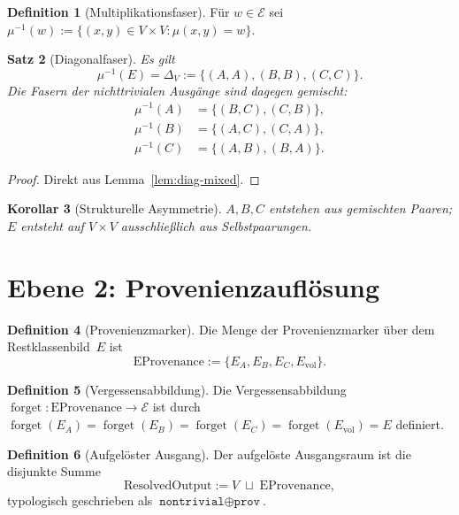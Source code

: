 \documentclass[11pt,a4paper]{article}
\newtheorem{theorem}{Satz}
\newtheorem{corollary}[theorem]{Korollar}
\theoremstyle{definition}
\newtheorem{definition}[theorem]{Definition}
\theoremstyle{remark}
\newcommand{\E}{\mathcal{E}}
\newcommand{\Evol}{E_{\mathrm{vol}}}
\newcommand{\forget}{\operatorname{forget}}
\begin{document}
	\begin{definition}[Multiplikationsfaser]
		\label{def:fiber}
		Für $w\in\E$ sei $\mu^{-1}(w):=\{(x,y)\in V\times V:\mu(x,y)=w\}$.
	\end{definition}
	
	\begin{theorem}[Diagonalfaser]
		\label{thm:diagonal-fiber}
		Es gilt
		\[
		\mu^{-1}(E)=\Delta_V:=\{(A,A),(B,B),(C,C)\}.
		\]
		Die Fasern der nichttrivialen Ausgänge sind dagegen gemischt:
		\begin{align*}
			\mu^{-1}(A)&=\{(B,C),(C,B)\},\\
			\mu^{-1}(B)&=\{(A,C),(C,A)\},\\
			\mu^{-1}(C)&=\{(A,B),(B,A)\}.
		\end{align*}
	\end{theorem}
	
	\begin{proof}
		Direkt aus Lemma~\ref{lem:diag-mixed}.
	\end{proof}
	
	\begin{corollary}[Strukturelle Asymmetrie]
		\label{cor:asymmetry}
		$A,B,C$ entstehen aus gemischten Paaren; $E$ entsteht auf $V\times V$
		ausschließlich aus Selbstpaarungen.
	\end{corollary}
	
	\section{Ebene 2: Provenienzauflösung}
	\label{sec:provenance}
	
	\begin{definition}[Provenienzmarker]
		\label{def:prov}
		Die Menge der Provenienzmarker über dem Restklassenbild~$E$ ist
		\[
		\mathrm{EProvenance}
		:=
		\{E_A,E_B,E_C,\Evol\}.
		\]
	\end{definition}
	
	\begin{definition}[Vergessensabbildung]
		\label{def:forget}
		Die Vergessensabbildung
		$\forget:\mathrm{EProvenance}\to\E$
		ist durch
		$\forget(E_A)=\forget(E_B)=\forget(E_C)=\forget(\Evol)=E$
		definiert.
	\end{definition}
	
	\begin{definition}[Aufgelöster Ausgang]
		\label{def:resolved}
		Der aufgelöste Ausgangsraum ist die disjunkte Summe
		\[
		\mathrm{ResolvedOutput}
		:=
		V\;\sqcup\;\mathrm{EProvenance},
		\]
		typologisch geschrieben als
		$\texttt{nontrivial}\oplus\texttt{prov}$.
	\end{definition}
	
\end{document}
